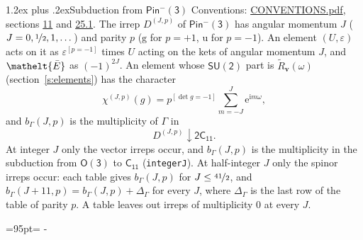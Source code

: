 \documentclass[10pt,a4paper]{article}
\makeatletter
\renewcommand\section{\@startsection{section}{1}{\z@}{-3ex plus -1ex minus -.2ex}%
  {1.2ex plus .2ex}{\normalfont\large\sffamily\bfseries\color{parttitle}}}
\newcommand{\needspace}[1]{\par\penalty-100\begingroup\dimen0=#1\relax\dimen2=\pagegoal
  \advance\dimen2-\pagetotal\ifdim\dimen0>\dimen2\relax\ifdim\dimen2>0pt\vfil\break\fi\fi
  \endgroup}
\numberwithin{equation}{section}
\newcommand{\eltfont}[1]{{\let\sigma\eltsigma\mathelt{#1}}}
\newcommand{\grp}[1]{\mathsf{#1}}
\newcommand{\elt}[1]{\eltfont{#1}}
\newcommand{\ptag}[1]{\mathrm{#1}}
\newcommand{\iverson}[1]{[#1]}
\newcommand{\restr}[2]{#1\!\downarrow#2}
\newcommand{\vv}{\mathbf{v}}
\newcommand{\iunit}{\mathrm{i}}
\newcommand{\expe}{\mathrm{e}}
\newcommand{\irrJp}[2]{D^{(#1,#2)}}
\newcommand{\barred}[1]{\bar{#1}}
\newcommand{\lift}[1]{\tilde{#1}}
\makeatother
\begin{document}
\section{Subduction from \texorpdfstring{$\grp{Pin^{-}(3)}$}{Pin(3)}}\label{s:subduction_parent}
Conventions: \href{../../CONVENTIONS.pdf}{CONVENTIONS.pdf}, sections \href{../../../rotation/CONVENTIONS.pdf\#conv.11}{11} and \href{../../CONVENTIONS.pdf\#conv.25.1}{25.1}.
\leavevmode\label{n:index.J}\label{n:index.parity}\label{n:irrep.o3}The irrep $\irrJp{J}{p}$ of \href{Pinminus3.pdf}{$\grp{Pin^{-}(3)}$} has angular momentum $J$ ($J = 0, \nicefrac{1}{2}, 1, \dots$) and parity $p$ ($\ptag{g}$ for $p = +1$, $\ptag{u}$ for $p = -1$). An element $(U, \varepsilon)$ acts on it as $\varepsilon^{[p = -1]}$ times $U$ acting on the kets of angular momentum $J$, and $\elt{\barred{E}}$ as $(-1)^{2J}$. \label{n:function.character.parent}\label{n:function.multiplicity}An element whose $\grp{SU(2)}$ part is $\lift{R}_{\vv}(\omega)$ (section~\ref{s:elements}) has the character
\begin{equation}\label{e:chi}\chi^{(J,p)}(g) = p^{\iverson{\det g = -1}}\sum_{m=-J}^{J} \expe^{\iunit m\omega},\end{equation}
and $b_\Gamma(J, p)$ is the multiplicity of $\Gamma$ in
\begin{equation}\label{e:parent}\restr{\irrJp{J}{p}}{\grp{2C_{11}}}.\end{equation}
At integer $J$ only the vector irreps occur, and $b_\Gamma(J, p)$ is the multiplicity in the subduction from $\grp{O(3)}$ to \href{../../../rotation/data/pdf/C11.pdf}{$\grp{C_{11}}$} (\texttt{integerJ}). \label{n:index.increment}At half-integer $J$ only the spinor irreps occur: each table gives $b_\Gamma(J, p)$ for $J \le \nicefrac{41}{2}$, and $b_\Gamma(J + 11, p) = b_\Gamma(J, p) + \Delta_\Gamma$ for every $J$, where $\Delta_\Gamma$ is the last row of the table of parity $p$. A table leaves out irreps of multiplicity 0 at every $J$.
\needspace{95pt}
\end{document}
